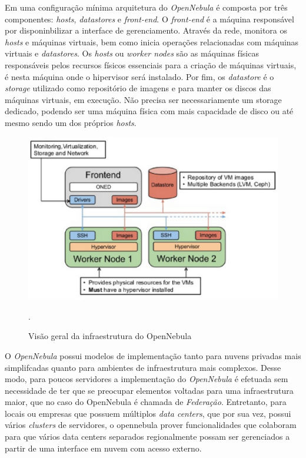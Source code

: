 Em uma configuração mínima  arquitetura do \textit{OpenNebula} é composta por três componentes: \textit{hosts}, \textit{datastores} e \textit{front-end}. O \textit{front-end} é a máquina responsável por disponinbilizar a interface de gerenciamento. Através da rede, monitora os \textit{hosts} e máquinas virtuais, bem como inicia operações relacionadas com máquinas virtuais e \textit{datastores}. Os \textit{hosts} ou \textit{worker nodes} são as máquinas físicas responsáveis pelos recursos físicos essenciais para a criação de máquinas virtuais, é nesta máquina onde o hipervisor será instalado. Por fim, os \textit{datastore} é o \textit{storage} utilizado como repositório de imagens e para manter os discos das máquinas virtuais, em execução. Não precisa ser necessariamente um storage dedicado, podendo ser uma máquina física com mais capacidade de disco ou até mesmo sendo um dos próprios \textit{hosts}.  


\begin{figure}[!htb]
\centering
\includegraphics [keepaspectratio=true,scale=0.60]{figuras/opennebula_instalation.eps}
\caption{Visão geral da infraestrutura do OpenNebula}
\cite{opennebula}.
\label{diagramaopennebula}
\end{figure}




O \textit{OpenNebula} possui modelos de implementação tanto para nuvens privadas mais simplifcadas quanto para ambientes de infraestrutura mais complexos. Desse modo, para poucos servidores a implementação do \textit{OpenNebula} é efetuada sem necessidade de ter que se preocupar elementos voltadas para uma infraestrutura maior, que no caso do OpenNebula é chamada de \textit{Federação}. Entretanto, para locais ou empresas que possuem múltiplos \textit{data centers}, que por sua vez, possui vários \textit{clusters} de servidores, o opennebula prover funcionalidades que colaboram para que vários data centers separados regionalmente possam ser gerenciados a partir de uma interface em nuvem com acesso externo. 


